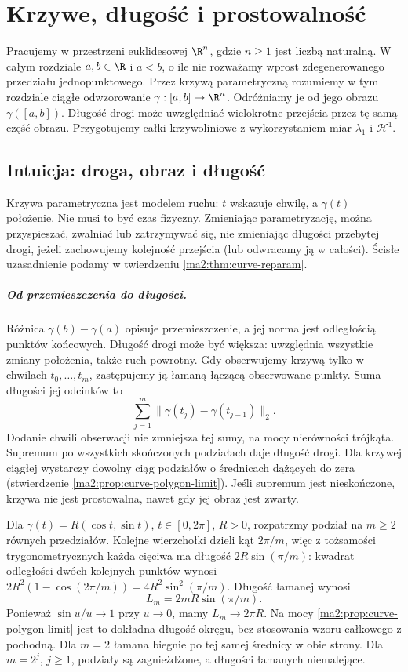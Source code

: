\chapter{Krzywe, długość i prostowalność}
\label{ma2:ch:rectifiable-curves}

Pracujemy w przestrzeni euklidesowej $\R^n$, gdzie
$n\ge1$ jest liczbą naturalną. W całym rozdziale
$a,b\in\R$ i $a<b$, o ile nie rozważamy wprost
zdegenerowanego przedziału jednopunktowego.
Przez krzywą parametryczną rozumiemy w tym rozdziale
ciągłe odwzorowanie $\gamma:[a,b]\to\R^n$.
Odróżniamy je od jego obrazu $\gamma([a,b])$. Długość drogi może
uwzględniać wielokrotne przejścia przez tę samą
część obrazu. Przygotujemy całki krzywoliniowe
z wykorzystaniem miar $\lambda_1$ i $\mathcal H^1$.

\section{Intuicja: droga, obraz i długość}

Krzywa parametryczna jest modelem ruchu:
$t$ wskazuje chwilę, a $\gamma(t)$ położenie.
Nie musi to być czas fizyczny. Zmieniając
parametryzację, można przyspieszać, zwalniać
lub zatrzymywać się, nie zmieniając długości
przebytej drogi, jeżeli zachowujemy kolejność
przejścia (lub odwracamy ją w całości).
Ścisłe uzasadnienie podamy w twierdzeniu
\ref{ma2:thm:curve-reparam}.

\paragraph{Od przemieszczenia do długości.}
Różnica $\gamma(b)-\gamma(a)$ opisuje
przemieszczenie, a jej norma jest odległością
punktów końcowych. Długość drogi może być
większa: uwzględnia wszystkie zmiany położenia,
także ruch powrotny. Gdy obserwujemy krzywą
tylko w chwilach $t_0,\ldots,t_m$, zastępujemy
ją łamaną łączącą obserwowane punkty.
Suma długości jej odcinków to
\[
 \sum_{j=1}^m
 \|\gamma(t_j)-\gamma(t_{j-1})\|_2.
\]
Dodanie chwili obserwacji nie zmniejsza
tej sumy, na mocy nierówności trójkąta.
Supremum po wszystkich skończonych
podziałach daje długość drogi.
Dla krzywej ciągłej wystarczy dowolny
ciąg podziałów o średnicach dążących
do zera (stwierdzenie
\ref{ma2:prop:curve-polygon-limit}).
Jeśli supremum jest nieskończone,
krzywa nie jest prostowalna, nawet
gdy jej obraz jest zwarty.

\begin{przyklad}
\label{ma2:ex:curve-circle-polygons}
Dla $\gamma(t)=R(\cos t,\sin t)$,
$t\in[0,2\pi]$, $R>0$, rozpatrzmy
podział na $m\ge2$ równych przedziałów.
Kolejne wierzchołki dzieli kąt $2\pi/m$,
więc z tożsamości trygonometrycznych
każda cięciwa ma długość $2R\sin(\pi/m)$:
kwadrat odległości dwóch kolejnych punktów
wynosi $2R^2(1-\cos(2\pi/m))=4R^2\sin^2(\pi/m)$.
Długość łamanej wynosi
\[
 L_m=2mR\sin(\pi/m).
\]
Ponieważ $\sin u/u\to1$ przy $u\to0$,
mamy $L_m\to2\pi R$. Na mocy
\ref{ma2:prop:curve-polygon-limit}
jest to dokładna długość okręgu,
bez stosowania wzoru całkowego
z pochodną. Dla $m=2$ łamana biegnie
po tej samej średnicy w obie strony.
Dla $m=2^j$, $j\ge1$, podziały są zagnieżdżone,
a długości łamanych niemalejące.
\end{przyklad}

